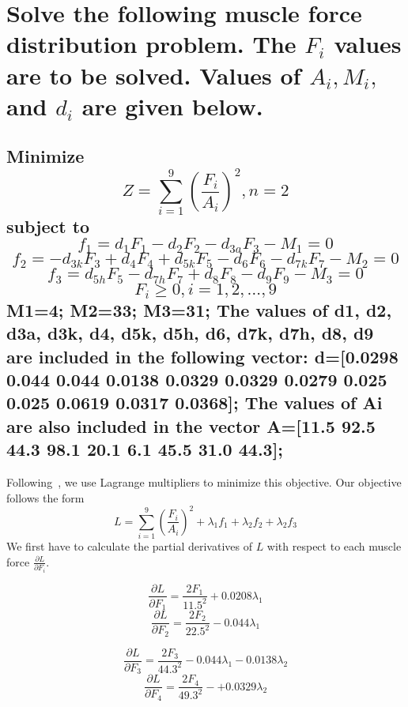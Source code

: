 \documentclass[11pt]{scrartcl}
\begin{document}
\section{Solve the following muscle force distribution problem. The $F_i$ values are to be solved.
Values of $A_i, M_i,$ and $d_i$ are given below.}
\subsection{Minimize 
\[Z = \sum_{i=1}^{9}(\frac{F_i}{A_i})^2, n=2\]
subject to 
\[f_1 = d_1F_1 - d_2F_2-d_{3a}F_3-M_1=0\]
\[f_2 = -d_{3k}F_3 + d_4F_4+d_{5k}F_5-d_6F_6-d_{7k}F_7-M_2 = 0\]
\[f_3 = d_{5h}F_5-d_{7h}F_7+d_8F_8-d_9F_9-M_3=0\]
\[F_i \geq 0, i=1, 2, \dots, 9\]
M1=4; M2=33; M3=31;
The values of d1, d2, d3a, d3k, d4, d5k, d5h, d6, d7k, d7h, d8, d9 are included in the following vector: d=[0.0298  0.044  0.044  0.0138  0.0329  0.0329  0.0279  0.025  0.025  0.0619  0.0317  0.0368];
The values of Ai are also included in the vector A=[11.5  92.5  44.3  98.1  20.1  6.1  45.5  31.0  44.3];
}
Following~\cite{RAIKOVA20011243},  we use Lagrange multipliers to minimize this objective.
Our objective follows the form
\begin{equation}
	\label{eq:lagrange}
	L = \sum_{i=1}^{9}(\frac{F_i}{A_i})^2 + \lambda_1f_1 + \lambda_2f_2 + \lambda_2f_3
\end{equation}
We first have to calculate the partial derivatives of $L$ with respect to each muscle force $\frac{\partial L}{\partial F_i}$.
\begin{multicols}{2}
	\begin{equation}
		\label{eq:F1}
		\frac{\partial L}{\partial F_1} = \frac{2F_1}{11.5^2} + 0.0208\lambda_1
	\end{equation}
	\begin{equation}
		\label{eq:F2}
		\frac{\partial L}{\partial F_2} = \frac{2F_2}{22.5^2} - 0.044\lambda_1
	\end{equation}
\end{multicols}
\begin{multicols}{2}
	\begin{equation}
		\label{eq:F3}
		\frac{\partial L}{\partial F_3} = \frac{2F_3}{44.3^2} -0.044\lambda_1-0.0138\lambda_2
	\end{equation}
	\begin{equation}
		\label{eq:F4}
		\frac{\partial L}{\partial F_4} = \frac{2F_4}{49.3^2} - +0.0329\lambda_2 
	\end{equation}
\end{multicols}
\end{document}
